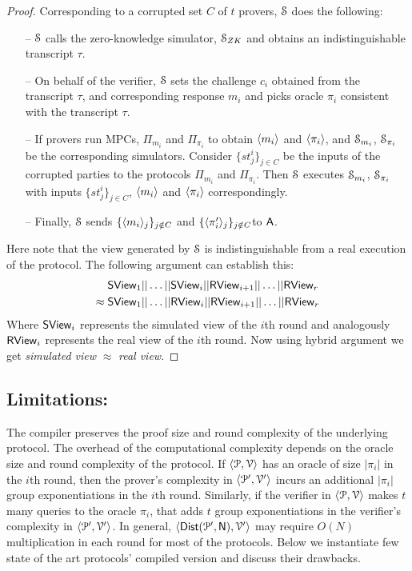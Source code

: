 \begin{proof}
	Corresponding to a corrupted set $C$ of $t$ provers, $\mathcal{S}$ does the following:
	\begin{itemize}
		\item[--] $\mathcal{S}$ calls the zero-knowledge simulator, $\mathcal{S}_{ZK}$ and obtains an indistinguishable transcript $\tau$.
		\item[--] On behalf of the verifier, $\mathcal{S}$ sets the challenge $c_i$ obtained from the transcript $\tau$, and corresponding response $m_i$ and picks oracle $\pi_i$ consistent with the transcript $\tau$.
		\item[--] If provers run MPCs, $\Pi_{m_i}$ and $\Pi_{\pi_i}$ to obtain $\langle m_i \rangle$ and $\langle \pi_i \rangle$, and $\mathcal{S}_{m_i}$, $\mathcal{S}_{\pi_i}$ be the corresponding simulators. Consider $\{st^i_j\}_{j\in C}$ be the inputs of the corrupted parties to the protocols $\Pi_{m_i}$ and $\Pi_{\pi_i}$. Then $\mathcal{S}$ executes $\mathcal{S}_{m_i}$, $\mathcal{S}_{\pi_i}$  with inputs $\{st^i_j\}_{j\in C}$, $\langle m_i \rangle$ and $\langle \pi_i \rangle$ correspondingly.
		\item[--] Finally, $\mathcal{S}$ sends $\{\langle m_i \rangle_j\}_{j\notin C}$ and $\{\langle \pi'_i \rangle_j\}_{j\notin C}$to $\mathsf{A}$.
	\end{itemize}
	Here note that the view generated by $\mathcal{S}$ is indistinguishable from a real execution of the protocol. The following argument can establish this:
	\begin{align*}
	& \mathsf{S View}_1 || \ldots ||\mathsf{S View}_i || \mathsf{R View}_{i+1}|| \ldots || \mathsf{R View}_r \\
	\approx\; 
	& \mathsf{S View}_1 || \ldots ||\mathsf{R View}_i || \mathsf{R View}_{i+1}|| \ldots || \mathsf{R View}_r 
	\end{align*}
	Where $\mathsf{S View}_i$ represents the simulated view of the $i$th round and analogously $\mathsf{R View}_i$ represents the real view of the $i$th round.
	Now using hybrid argument we get \textit{simulated view} $\approx$ \textit{real view}.
\end{proof}
\subsection{Limitations:}\label{sec:limitations}
The compiler preserves the proof size and round complexity of the underlying protocol. The overhead of the computational complexity depends on the oracle size and round complexity of the protocol. If $\langle \mathcal{P}, \mathcal{V} \rangle$ has an oracle of size $|\pi_i|$ in the $i$th round, then the prover's complexity in $\langle \mathcal{P}', \mathcal{V}' \rangle$ incurs an additional $|\pi_i|$ group exponentiations in the $i$th round. Similarly, if the verifier in $\langle \mathcal{P}, \mathcal{V} \rangle$ makes $t$ many queries to the oracle $\pi_i$, that adds $t$ group exponentiations in the verifier's complexity in $\langle \mathcal{P}', \mathcal{V}' \rangle$. In general, $\langle \mathsf{Dist}(\mathcal{P}', \mathsf{N}), \mathcal{V}' \rangle$ may require $O(N)$ multiplication in each round for most of the protocols.
Below we instantiate few state of the art protocols' compiled version and discuss their drawbacks.
